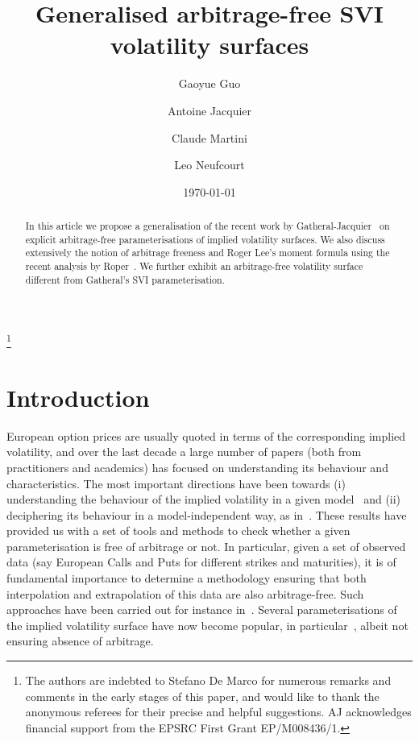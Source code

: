 \documentclass{amsart}[11pt]
\numberwithin{equation}{section}
\theoremstyle{definition}
\begin{document}
\title{Generalised arbitrage-free SVI volatility surfaces}
\author{Gaoyue Guo}
\address{Ecole Polytechnique Paris}
\author{Antoine Jacquier}
\address{Department of Mathematics, Imperial College London}
\author{Claude Martini}
\address{Zeliade Systems, Paris}
\author{Leo Neufcourt}
\address{Department of Statistics, Columbia University}
\thanks{The authors are indebted to Stefano De Marco for numerous remarks and comments in the early stages of this paper, and would like to thank the anonymous referees for their precise and helpful suggestions.
AJ acknowledges financial support from the EPSRC First Grant EP/M008436/1.}
\date{\today}
\begin{abstract}
In this article we propose a generalisation of the recent work by Gatheral-Jacquier~\cite{gj} 
on explicit arbitrage-free parameterisations of implied volatility surfaces. 
We also discuss extensively the notion of arbitrage freeness and Roger Lee's moment formula using the recent analysis by Roper~\cite{roper}.
We further exhibit an arbitrage-free volatility surface different from Gatheral's SVI parameterisation.
\end{abstract}

\maketitle



\section{Introduction}
European option prices are usually quoted in terms of the corresponding implied volatility, 
and over the last decade a large number of papers (both from practitioners and academics) 
has focused on understanding its behaviour and characteristics.
The most important directions have been towards (i) understanding the behaviour of the implied volatility in a given model~\cite{BF, BBF, FGGS, GuSt} and (ii) deciphering its behaviour in a model-independent way, 
as in~\cite{Lee, roper, RT10}.
These results have provided us with a set of tools and methods to check
whether a given parameterisation is free of arbitrage or not. 
In particular, given a set of observed data (say European Calls and Puts for different strikes and maturities), 
it is of fundamental importance to determine a methodology ensuring that both 
interpolation and extrapolation of this data are also arbitrage-free.
Such approaches have been carried out for instance in~\cite{CarrWu, Fengler, Zeliade}.
Several parameterisations of the implied volatility surface  have now become popular, 
in particular~\cite{Gatheral:2004, Hagan, HypHyp}, albeit not ensuring absence of arbitrage. 
\end{document}
